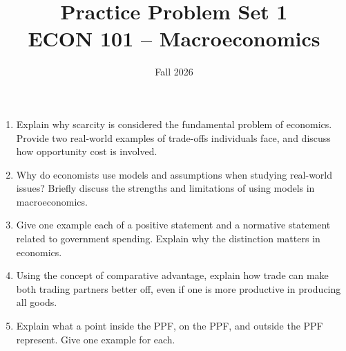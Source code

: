 \documentclass[12pt]{article}
\title{Practice Problem Set 1\\ \vspace{15pt} \large ECON 101 -- Macroeconomics}
\author{}
\date{Fall 2026}
\begin{document}
\maketitle



\begin{enumerate}
  \item 
  Explain why scarcity is considered the fundamental problem of economics. Provide two real-world examples of trade-offs individuals face, and discuss how opportunity cost is involved.

  \item 
  Why do economists use models and assumptions when studying real-world issues? Briefly discuss the strengths and limitations of using models in macroeconomics.

  \item
  Give one example each of a positive statement and a normative statement related to government spending. Explain why the distinction matters in economics.

  \item
  Using the concept of comparative advantage, explain how trade can make both trading partners better off, even if one is more productive in producing all goods.

  \item
  Explain what a point inside the PPF, on the PPF, and outside the PPF represent. Give one example for each.
\end{enumerate}
\end{document}
